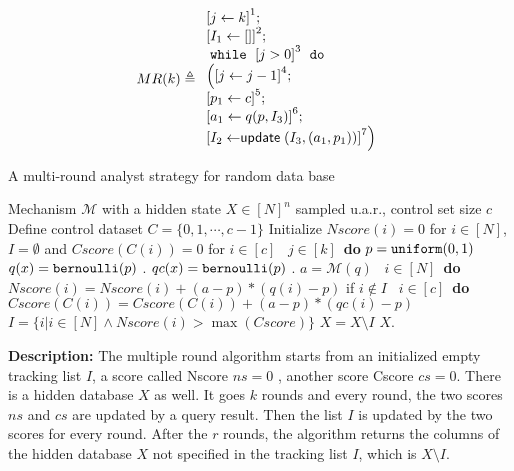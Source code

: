 \begin{example}
%
\[
%
MR(k) \triangleq
\begin{array}{l}
     \left[j \leftarrow k \right]^1 ; \\
    \left[I_1 \leftarrow [] \right]^2; \\
    \ewhile ~ \clabel{j > 0}^{3} ~ \edo ~ \\
    \Big(
    \clabel{\assign{j}{j-1}}^{4} ;\\
    \left[p_1 \leftarrow c \right]^5; \\
    \left[ a_1 \leftarrow q (p, I_3) \right]^6;\\
    \left[I_2 \leftarrow \mathrel{\mathsf{update}} ( {I_3}, (a_1, p_1))  \right]^7
    \Big) 
\end{array}
\]
%
\begin{algorithm}
\footnotesize
\caption{A multi-round analyst strategy for random data base \cite{dwork2015preserving}}
\label{alg:multiRound}
\begin{algorithmic}
\REQUIRE Mechanism $\mathcal{M}$ with a hidden state $X\in [N]^{n}$ sampled u.a.r., control set size $c$
\STATE Define control dataset $C = \{0,1, \cdots, c - 1\}$
\STATE Initialize $Nscore(i) = 0$ for $i \in [N]$, $I = \emptyset$ and $Cscore(C(i)) = 0$ for $i \in [c]$
\ $j\in [k]$\ {\bf do} 
\STATE {} $p=\mathtt{uniform}(0,1)$ 
\STATE {} $q (x) = \mathtt{bernoulli} ( p )$ .
\STATE {} $qc (x) = \mathtt{bernoulli} ( p )$ .
\STATE {} $a = \mathcal{M}(q)$ 
\STATE {}\ $i \in [N]$\ {\bf do}
\STATE \qquad \qquad $Nscore(i) = Nscore(i) + (a - p)*(q (i) - p)$ if $i \notin I$
\STATE {}\ $i \in [c]$\ {\bf do}
\STATE \qquad \qquad $Cscore(C(i)) = Cscore(C(i)) + (a - p)*(qc (i) - p)$
\STATE {} $I = \{i | i\in [N] \land Nscore(i) > \max(Cscore)\}$
\STATE {} $X = X \setminus I$ 
\RETURN $X$.
\end{algorithmic}
\end{algorithm}
%
%
\end{example}
\textbf{Description:}
The multiple round algorithm starts from an initialized empty tracking list $I$, a score called Nscore $ns=0$ , another score Cscore $cs=0$. There is a hidden database $X$ as well.
It goes $k$ rounds and every round, the two scores $ns$ and $cs$ are updated by a query result. Then the list $I$ is updated by the two scores for every round. After the $r$ rounds, the algorithm returns the columns of the hidden database $X$ not specified in the tracking list $I$, which is $X\setminus I$. 

